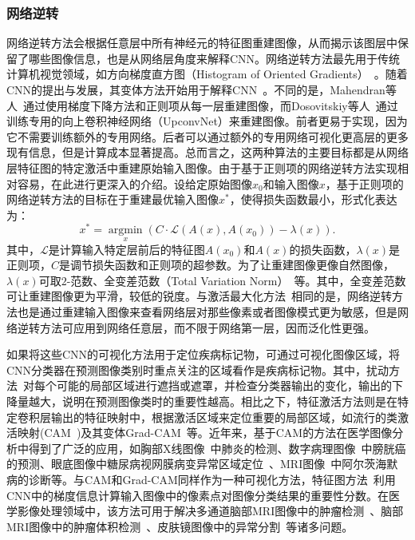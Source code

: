 \subsubsection{网络逆转}
网络逆转方法会根据任意层中所有神经元的特征图重建图像，从而揭示该图层中保留了哪些图像信息，也是从网络层角度来解释CNN。网络逆转方法最先用于传统计算机视觉领域，如方向梯度直方图（Histogram of Oriented Gradients）~\cite{dalal2005histograms}。随着CNN的提出与发展，其变体方法开始用于解释CNN~\cite{mahendran2015understanding, mahendran2016visualizing, dosovitskiy2016inverting}。不同的是，Mahendran等人~\cite{mahendran2015understanding, mahendran2016visualizing}通过使用梯度下降方法和正则项从每一层重建图像，而Dosovitskiy等人~\cite{dosovitskiy2016inverting}通过训练专用的向上卷积神经网络（UpconvNet）来重建图像。前者更易于实现，因为它不需要训练额外的专用网络。后者可以通过额外的专用网络可视化更高层的更多现有信息，但是计算成本显著提高。总而言之，这两种算法的主要目标都是从网络层特征图的特定激活中重建原始输入图像。由于基于正则项的网络逆转方法实现相对容易，在此进行更深入的介绍。设给定原始图像$x_0$和输入图像$x$，基于正则项的网络逆转方法的目标在于重建最优输入图像$x^*$，使得损失函数最小，形式化表达为：
\begin{equation*}
x^{*}=\underset{x}{\operatorname{argmin}}\left(C \cdot \mathcal{L}\left(A(x), A\left(x_{0}\right)\right)-\lambda(x)\right).
\end{equation*}
其中，$\mathcal{L}$是计算输入特定层前后的特征图$A(x_0)$和$A(x)$的损失函数，$\lambda(x)$是正则项，$C$是调节损失函数和正则项的超参数。为了让重建图像更像自然图像，$\lambda(x)$可取$2$-范数、全变差范数（Total Variation Norm）~\cite{rudin1992nonlinear}等。其中，全变差范数可让重建图像更为平滑，较低的锐度。与激活最大化方法~\cite{simonyan2013deep}相同的是，网络逆转方法也是通过重建输入图像来查看网络层对那些像素或者图像模式更为敏感，但是网络逆转方法可应用到网络任意层，而不限于网络第一层，因而泛化性更强。

如果将这些CNN的可视化方法用于定位疾病标记物，可通过可视化图像区域，将CNN分类器在预测图像类别时重点关注的区域看作是疾病标记物。其中，扰动方法~\cite{zintgraf2017visualizing}对每个可能的局部区域进行遮挡或遮罩，并检查分类器输出的变化，输出的下降量越大，说明在预测图像类时的重要性越高。相比之下，特征激活方法则是在特定卷积层输出的特征映射中，根据激活区域来定位重要的局部区域，如流行的类激活映射(CAM~\cite{zhou2016learning})及其变体Grad-CAM~\cite{selvaraju2017grad}等。近年来，基于CAM的方法在医学图像分析中得到了广泛的应用，如胸部X线图像~\cite{rajpurkar2017chexnet}中肺炎的检测、数字病理图像~\cite{zhang2017mdnet}中膀胱癌的预测、眼底图像中糖尿病视网膜病变异常区域定位~\cite{Gondaletal17}、MRI图像~\cite{yang2018visual}中阿尔茨海默病的诊断等。与CAM和Grad-CAM同样作为一种可视化方法，特征图方法~\cite{simonyan2013deep}利用CNN中的梯度信息计算输入图像中的像素点对图像分类结果的重要性分数。在医学影像处理领域中，该方法可用于解决多通道脑部MRI图像中的肿瘤检测~\cite{banerjee2016novel}、脑部MRI图像中的肿瘤体积检测~\cite{mitra2017volumetric}、皮肤镜图像中的异常分割~\cite{jahanifar2018supervised}等诸多问题。

